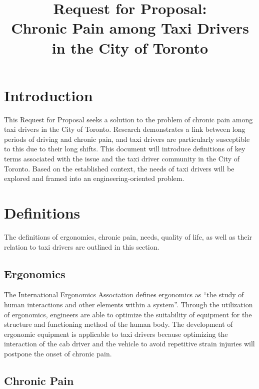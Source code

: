 \documentclass[11pt]{article}
\begin{document}
\title{Request for Proposal: \\Chronic Pain among Taxi Drivers in the
  City of Toronto}
\maketitle
\begin{abstract}

\end{abstract}
\tableofcontents
\section{Introduction}
\label{sec:intro}
This Request for Proposal seeks a solution to the problem of chronic
pain among taxi drivers in the City of Toronto. Research demonstrates a
link between long periods of driving and chronic pain\cite{KneePain,
Okunribido2008}, and taxi drivers are particularly susceptible to this
due to their long shifts\cite{thestar2012, KneePain}. This document will introduce
definitions of key terms associated with the issue and the taxi driver community
in the City of Toronto. Based on the established context, the needs of taxi drivers
will be explored and framed into an engineering-oriented problem. 

\section{Definitions}
\label{sec:defs}
The definitions of ergonomics, chronic pain, needs, quality of life, as
well as their relation to taxi drivers are outlined in this section.

\subsection{Ergonomics}
\label{sec:ergonomics}

The International Ergonomics Association defines ergonomics as “the
study of human interactions and other elements within a system”\cite{ergo}. 
Through the utilization of ergonomics, engineers are able to optimize the suitability
of equipment for the structure and functioning method of the human
body. The development of ergonomic equipment is applicable to
taxi drivers because optimizing the interaction of the cab driver
and the vehicle to avoid repetitive strain injuries will postpone
the onset of chronic pain. 

\subsection{Chronic Pain}
\label{sec:pain}
\end{document}
